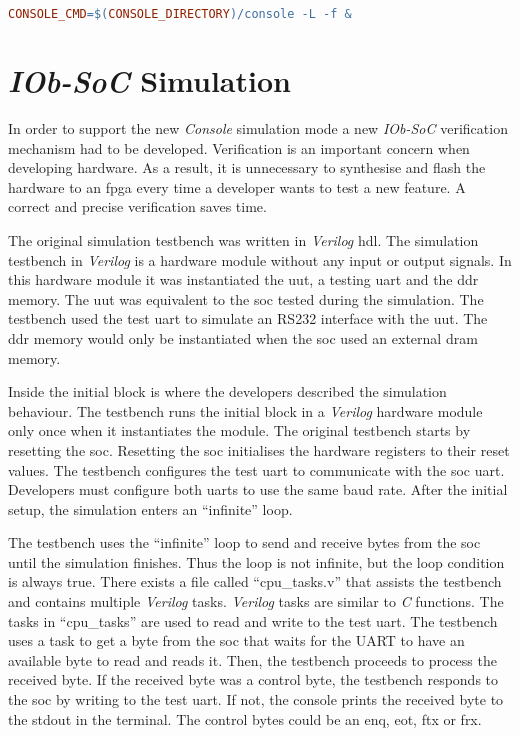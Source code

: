 \begin{lstlisting}[language=make, caption={Call \textit{Console} program}, label=lst:call_console]
    CONSOLE_CMD=$(CONSOLE_DIRECTORY)/console -L -f &
\end{lstlisting}

\section{\textit{IOb-SoC} Simulation}
\label{section:simulation}
In order to support the new \textit{Console} simulation mode a new \textit{IOb-SoC} verification mechanism had to be developed. Verification is an important concern when developing hardware. As a result, it is unnecessary to synthesise and flash the hardware to an \acrshort{fpga} every time a developer wants to test a new feature. A correct and precise verification saves time.

The original simulation testbench was written in \textit{Verilog} \acrshort{hdl}. The simulation testbench in \textit{Verilog} is a hardware module without any input or output signals. In this hardware module it was instantiated the \acrfull{uut}, a testing \acrshort{uart} and the \acrshort{ddr} memory. The \acrshort{uut} was equivalent to the \acrshort{soc} tested during the simulation. The testbench used the test \acrshort{uart} to simulate an RS232 interface with the \acrshort{uut}. The \acrshort{ddr} memory would only be instantiated when the \acrshort{soc} used an external \acrshort{dram} memory.

Inside the initial block is where the developers described the simulation behaviour. The testbench runs the initial block in a \textit{Verilog} hardware module only once when it instantiates the module. The original testbench starts by resetting the \acrshort{soc}. Resetting the \acrshort{soc} initialises the hardware registers to their reset values. The testbench configures the test \acrshort{uart} to communicate with the \acrshort{soc} \acrshort{uart}. Developers must configure both \acrshort{uart}s to use the same baud rate. After the initial setup, the simulation enters an \enquote{infinite} loop.

The testbench uses the \enquote{infinite} loop to send and receive bytes from the \acrshort{soc} until the simulation finishes. Thus the loop is not infinite, but the loop condition is always true. There exists a file called \enquote{cpu\_tasks.v} that assists the testbench and contains multiple \textit{Verilog} tasks.  \textit{Verilog} tasks are similar to \textit{C} functions. The tasks in \enquote{cpu\_tasks} are used to read and write to the test \acrshort{uart}. The testbench uses a task to get a byte from the \acrshort{soc} that waits for the UART to have an available byte to read and reads it. Then, the testbench proceeds to process the received byte. If the received byte was a control byte, the testbench responds to the \acrshort{soc} by writing to the test \acrshort{uart}. If not, the console prints the received byte to the stdout in the terminal. The control bytes could be an \acrfull{enq}, \acrfull{eot}, \acrfull{ftx} or \acrfull{frx}.

